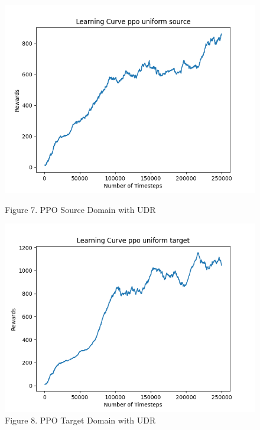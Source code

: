 \documentclass[12pt]{article}
\begin{document}
\begin{figure}[H]
    \vfill
    \begin{minipage}{0.45\textwidth}
        \centering
        \includegraphics[width=\textwidth]{../images/Learning_Curve_PPO_Uniform_Source.png}
        \caption{Figure 7. PPO Source Domain with UDR}
        \label{fig:ppo_source_udr}
    \end{minipage}
    \hfill
    \begin{minipage}{0.45\textwidth}
        \centering
        \includegraphics[width=\textwidth]{../images/Learning_Curve_PPO_Uniform_Target.png}
        \caption{Figure 8. PPO Target Domain with UDR}
        \label{fig:ppo_target_udr}
    \end{minipage}
\end{figure}
\end{document}
